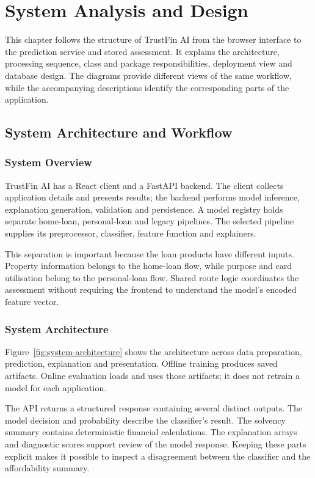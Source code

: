 \chapter[SYSTEM ANALYSIS AND DESIGN]{System Analysis and Design}

This chapter follows the structure of TrustFin AI from the browser interface to the prediction service and stored assessment. It explains the architecture, processing sequence, class and package responsibilities, deployment view and database design. The diagrams provide different views of the same workflow, while the accompanying descriptions identify the corresponding parts of the application.

\section{System Architecture and Workflow}
\subsection{System Overview}
TrustFin AI has a React client and a FastAPI backend. The client collects application details and presents results; the backend performs model inference, explanation generation, validation and persistence. A model registry holds separate home-loan, personal-loan and legacy pipelines. The selected pipeline supplies its preprocessor, classifier, feature function and explainers.

This separation is important because the loan products have different inputs. Property information belongs to the home-loan flow, while purpose and card utilisation belong to the personal-loan flow. Shared route logic coordinates the assessment without requiring the frontend to understand the model's encoded feature vector.

\subsection{System Architecture}
Figure~\ref{fig:system-architecture} shows the architecture across data preparation, prediction, explanation and presentation. Offline training produces saved artifacts. Online evaluation loads and uses those artifacts; it does not retrain a model for each application.

The API returns a structured response containing several distinct outputs. The model decision and probability describe the classifier's result. The solvency summary contains deterministic financial calculations. The explanation arrays and diagnostic scores support review of the model response. Keeping these parts explicit makes it possible to inspect a disagreement between the classifier and the affordability summary.

